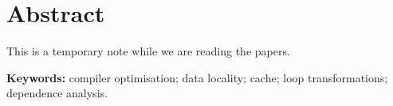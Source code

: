 \chapter*{Abstract}

This is a temporary note while we are reading the papers.

\bigskip
\noindent\textbf{Keywords:} compiler optimisation; data locality; cache;
loop transformations; dependence analysis.
